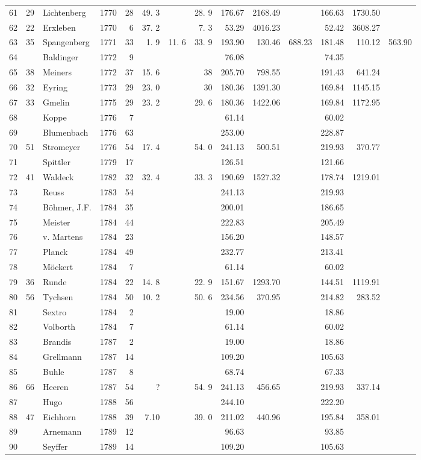 \begin{center}
\begin{tabular}{|r|r|l|r|r|r|r|r|r|r|r|r|r|r|}
61&29&Lichtenberg&1770&28&49. 3&&28. 9&176.67&2168.49&&166.63&1730.50&\\
62&22&Erxleben&1770&6&37. 2&&7. 3&53.29&4016.23&&52.42&3608.27&\\
63&35&Spangenberg&1771&33&1. 9&11. 6&33. 9&193.90&130.46&688.23&181.48&110.12&563.90\\
64&&Baldinger&1772&9&&&&76.08&&&74.35&&\\
65&38&Meiners&1772&37&15. 6&&38&205.70&798.55&&191.43&641.24&\\
66&32&Eyring&1773&29&23. 0&&30&180.36&1391.30&&169.84&1145.15&\\
67&33&Gmelin&1775&29&23. 2&&29. 6&180.36&1422.06&&169.84&1172.95&\\
68&&Koppe&1776&7&&&&61.14&&&60.02&&\\
69&&Blumenbach&1776&63&&&&253.00&&&228.87&&\\
70&51&Stromeyer&1776&54&17. 4&&54. 0&241.13&500.51&&219.93&370.77&\\[3pt]
71&&Spittler&1779&17&&&&126.51&&&121.66&&\\
72&41&Waldeck&1782&32&32. 4&&33. 3&190.69&1527.32&&178.74&1219.01&\\
73&&Reuss&1783&54&&&&241.13&&&219.93&&\\
74&&Böhmer, J.F.&1784&35&&&&200.01&&&186.65&&\\
75&&Meister&1784&44&&&&222.83&&&205.49&&\\
76&&v. Martens&1784&23&&&&156.20&&&148.57&&\\
77&&Planck&1784&49&&&&232.77&&&213.41&&\\
78&&Möckert&1784&7&&&&61.14&&&60.02&&\\
79&36&Runde&1784&22&14. 8&&22. 9&151.67&1293.70&&144.51&1119.91&\\
80&56&Tychsen&1784&50&10. 2&&50. 6&234.56&370.95&&214.82&283.52&\\[3pt]
81&&Sextro&1784&2&&&&19.00&&&18.86&&\\
82&&Volborth&1784&7&&&&61.14&&&60.02&&\\
83&&Brandis&1787&2&&&&19.00&&&18.86&&\\
84&&Grellmann&1787&14&&&&109.20&&&105.63&&\\
85&&Buhle&1787&8&&&&68.74&&&67.33&&\\
86&66&Heeren&1787&54&?&&54. 9&241.13&456.65&&219.93&337.14&\\
87&&Hugo&1788&56&&&&244.10&&&222.20&&\\
88&47&Eichhorn&1788&39&7.10&&39. 0&211.02&440.96&&195.84&358.01&\\
89&&Arnemann&1789&12&&&&96.63&&&93.85&&\\
90&&Seyffer&1789&14&&&&109.20&&&105.63&&\\\hline
\end{tabular}
\end{center}
